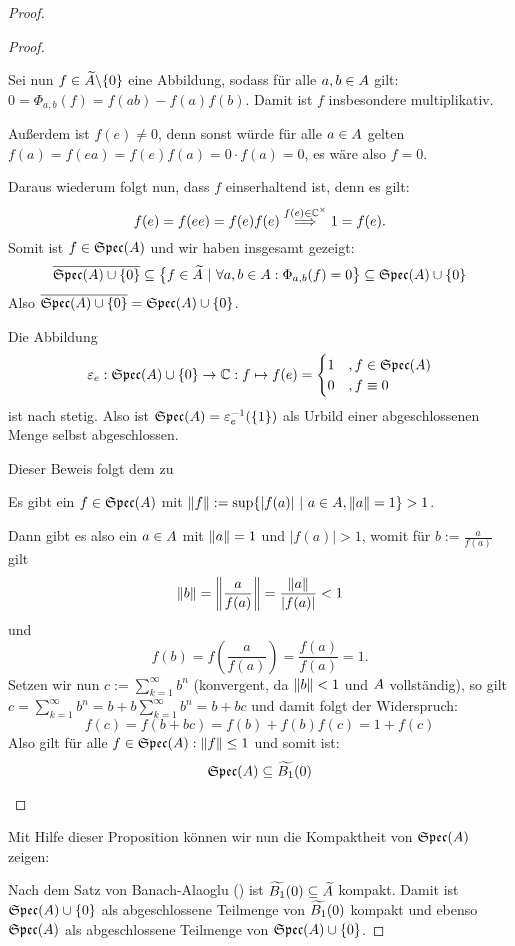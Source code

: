 \begin{proof}
\begin{proof}
\begin{proofenum}
Sei nun $f \in \widetilde{A} \backslash \{0\}$ eine Abbildung, sodass für alle $a, b \in A$ gilt: $0 = \Phi_{a,b}(f) = f(ab) - f(a)f(b)$. Damit ist $f$ insbesondere multiplikativ. 

Außerdem ist $f(e) \neq 0$, denn sonst würde für alle $a \in A$ gelten $f(a) = f(ea) = f(e)f(a) = 0\cdot f(a) = 0$, es wäre also $f = 0$. 

Daraus wiederum folgt nun, dass $f$ einserhaltend ist, denn es gilt:
	\[f(e) = f(ee) = f(e)f(e) \overset{f(e) \in \mathbb{C}^\times}{\Longrightarrow} 1 = f(e).\]
Somit ist $f \in \mathfrak{Spec}(A)$ und wir haben insgesamt gezeigt:
	\[\overline{\mathfrak{Spec}(A) \cup \{0\}} \subseteq \big\{f \in \widetilde{A} ~|~ \forall a,b \in A: \Phi_{a,b}(f) = 0 \big\} \subseteq \mathfrak{Spec}(A) \cup \{0\} \]
	Also $\overline{\mathfrak{Spec}(A) \cup \{0\}} = \mathfrak{Spec}(A) \cup \{0\}$.
	
	\item %
	Die Abbildung 
	\[\varepsilon_e: \mathfrak{Spec}(A) \cup \{0\} \to \mathbb{C}: f \mapsto f(e) = \begin{cases} 1 &, f \in \mathfrak{Spec}(A) \\ 0 &, f \equiv 0 \end{cases}\]
	ist nach  stetig. Also ist $\mathfrak{Spec}(A) = \varepsilon_e^{-1}(\{1\})$ als Urbild einer abgeschlossenen Menge selbst abgeschlossen.
	
	\item Dieser Beweis folgt dem zu \cite[Lemma IX.2.2]{Werner2011}
	
	\Ann Es gibt ein $f \in \mathfrak{Spec}(A)$ mit $\left\lVert f\right\rVert := \sup\{|f(a)| ~|~ a\in A, \left\lVert a\right\rVert = 1\} > 1$. 
	
	Dann gibt es also ein $a \in A$ mit $\left\lVert a\right\rVert = 1$ und $|f(a)| > 1$, womit für $b := \frac{a}{f(a)}$ gilt
	\[ \left\lVert b\right\rVert = \left\lVert\frac{a}{f(a)}\right\rVert = \frac{\left\lVert a\right\rVert}{|f(a)|} < 1 \]
	und
	\[ f(b) = f\left(\frac{a}{f(a)}\right) = \frac{f(a)}{f(a)} = 1.\]
	Setzen wir nun $c := \sum_{k=1}^\infty b^n$ (konvergent, da $\left\lVert b\right\rVert < 1$ und $A$ vollständig), so gilt $c = \sum_{k=1}^\infty b^n = b + b\sum_{k=1}^\infty b^n = b+bc$ und damit folgt der Widerspruch:
	\[f(c) = f(b+bc) = f(b) + f(b)f(c) = 1 + f(c)\]
	Also gilt für alle $f \in \mathfrak{Spec}(A): \left\lVert f\right\rVert \leq 1$ und somit ist:
	\[\mathfrak{Spec}(A) \subseteq \widetilde{B_1}(0) \qedhere\]\end{proofenum}
\end{proof}

Mit Hilfe dieser Proposition können wir nun die Kompaktheit von $\mathfrak{Spec}(A)$ zeigen:

Nach dem Satz von Banach-Alaoglu () ist $\widetilde{B_1}(0) \subseteq \widetilde{A}$ kompakt. Damit ist $\mathfrak{Spec}(A)\cup\{0\}$ als abgeschlossene Teilmenge von $\widetilde{B_1}(0)$ kompakt und ebenso $\mathfrak{Spec}(A)$ als abgeschlossene Teilmenge von $\mathfrak{Spec}(A)\cup\{0\}$.
\end{proof}

